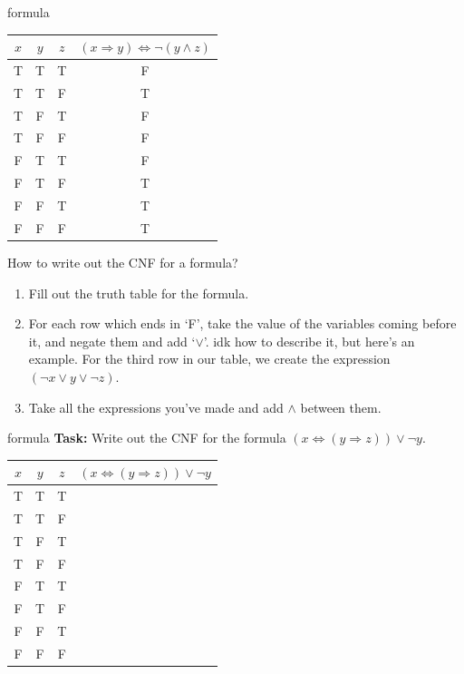 \documentclass{beamer}
\begin{document}
\begin{frame}{formula}
\begin{center}
\begin{tabular}{|c|c|c|c|}
\hline
$x$ & $y$ & $z$ & $(x \Rightarrow y) \Leftrightarrow \neg (y \land z)$\\
\hline
\color{red} T & \color{red} T & \color{red} T & \color{red} F\\
\hline
T & T & F & T\\
\hline
\color{red} T & \color{red} F & \color{red} T & \color{red} F\\
\hline
\color{red} T & \color{red} F & \color{red} F & \color{red} F\\
\hline
\color{red} F & \color{red} T & \color{red} T & \color{red} F\\
\hline
F & T & F & T\\
\hline
F & F & T & T\\
\hline
F & F & F & T\\
\hline
\end{tabular}
\end{center}
How to write out the CNF for a formula?
\begin{enumerate}[label=(\arabic*)]
\item Fill out the truth table for the formula.
\item For each row which ends in `F', take the value of the variables coming before it, and negate them and add `$\lor$'. idk how to describe it, but here's an example. For the third row in our table, we create the expression $(\neg x \lor y \lor \neg z)$.
\item Take all the expressions you've made and add $\land$ between them.
\end{enumerate}
\end{frame}

\begin{frame}{formula}
\textbf{Task: } Write out the CNF for the formula $(x \Leftrightarrow (y \Rightarrow z)) \lor \neg y$.
\begin{center}
\begin{tabular}{|c|c|c|c|}
\hline
$x$ & $y$ & $z$ & $(x \Leftrightarrow (y \Rightarrow z)) \lor \neg y$\\
\hline
T & T & T & \\
\hline
T & T & F & \\
\hline
T & F & T & \\
\hline
T & F & F & \\
\hline
F & T & T & \\
\hline
F & T & F & \\
\hline
F & F & T & \\
\hline
F & F & F & \\
\hline
\end{tabular}
\end{center}
\end{frame}
\end{document}
